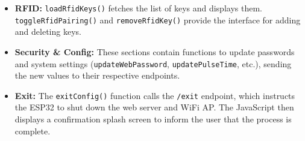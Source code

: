 \documentclass{article}
\begin{document}
\begin{itemize}
\begin{itemize}
        \item \texttt{drawChart()}: Redraws the canvas with the latest data, showing the confidence trend over the last 60 seconds, along with lines for the authentication and de-authentication thresholds.
    \end{itemize}
    \item \textbf{RFID:} \texttt{loadRfidKeys()} fetches the list of keys and displays them. \texttt{toggleRfidPairing()} and \texttt{removeRfidKey()} provide the interface for adding and deleting keys.
    \item \textbf{Security \& Config:} These sections contain functions to update passwords and system settings (\texttt{updateWebPassword}, \texttt{updatePulseTime}, etc.), sending the new values to their respective endpoints.
    \item \textbf{Exit:} The \texttt{exitConfig()} function calls the \texttt{/exit} endpoint, which instructs the ESP32 to shut down the web server and WiFi AP. The JavaScript then displays a confirmation splash screen to inform the user that the process is complete.
\end{itemize}
\end{document}
